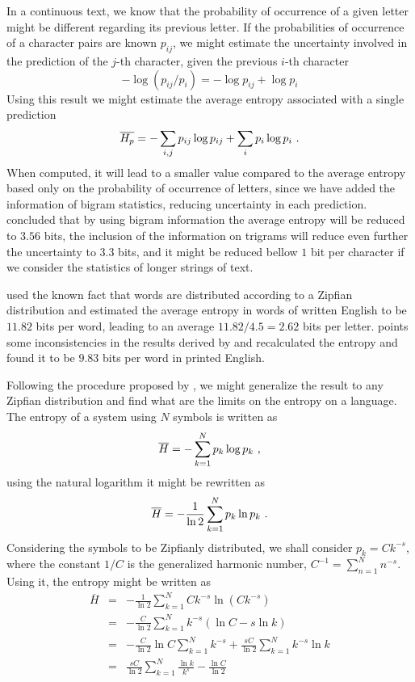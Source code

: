 In a continuous text, we know that the probability of occurrence of a given letter
might be different regarding its previous letter. If the probabilities of occurrence
of a character pairs are known $p_{ij}$, we might estimate the uncertainty involved
in the prediction of the $j$-th character, given the previous $i$-th character
\begin{equation}
- \log (p_{ij} / p_i) = -\log p_{ij} + \log p_i
\end{equation}
Using this result we might estimate the average entropy associated with a single
prediction
\begin{equation}
\overline{H_p} = - \sum_{i,j} p_{ij} \log p_{ij} + \sum_i p_i \log p_i \textmd{ .}
\end{equation}
When computed, it will lead to a smaller value compared to the average entropy 
based only on the probability of occurrence of letters, since we have added
the information of bigram statistics, reducing uncertainty in each prediction.
\cite{shannon1951} concluded that by using bigram information the average 
entropy will be reduced to $3.56$ bits, the inclusion of the information
on trigrams will reduce even further the uncertainty to $3.3$ bits,
and it might be reduced bellow  $1$ bit per character if we consider the
statistics of longer strings of text.

\cite{shannon1951} used the known fact that words are distributed according to 
a Zipfian distribution and estimated the average entropy in words of written English
to be $11.82$ bits per word, leading to an average $11.82/4.5=2.62$ bits per letter.
\cite{grignetti} points some inconsistencies in the results derived by \cite{shannon1951}
and recalculated the entropy and found it to be $9.83$ bits per word in printed English.

Following the procedure proposed by \cite{grignetti}, we might generalize the result to
any Zipfian distribution and find what are the limits on the entropy on a language.
The entropy of a system using $N$ symbols is written as
\begin{equation}
\overline{H} = - \sum_{k=1}^N p_{k} \log p_{k} \textmd{ ,}
\end{equation}
using the natural logarithm it might be rewritten as
\begin{equation}
\overline{H} = -\frac{1}{\ln 2} \sum_{k=1}^N p_{k} \ln p_{k} \textmd{ .}
\end{equation}
Considering the symbols to be Zipfianly distributed, we shall consider $p_k=Ck^{-s}$,
where the constant $1/C$ is the generalized harmonic number, $C^{-1}=\sum_{n=1}^N n^{-s}$.
Using it, the entropy might be written as
\begin{eqnarray}
\label{eq:ent_zipfian_source}
\overline{H} &=& -\frac{1}{\ln 2} \sum_{k=1}^N Ck^{-s} \ln (Ck^{-s}) \nonumber \\
             &=& -\frac{C}{\ln 2} \sum_{k=1}^N k^{-s} (\ln C - s\ln k) \nonumber \\
             &=& -\frac{C}{\ln 2} \ln C \sum_{k=1}^N k^{-s} + \frac{sC}{\ln 2} \sum_{k=1}^N k^{-s} \ln k \nonumber \\
             &=& \frac{sC}{\ln 2} \sum_{k=1}^N \frac{\ln k}{k^s} - \frac{\ln C}{\ln 2}
\end{eqnarray} 


